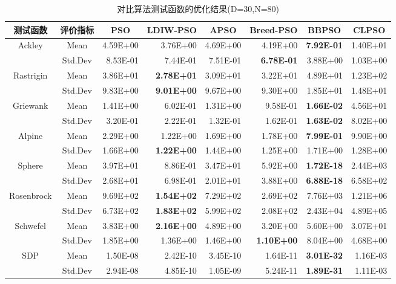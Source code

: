 \begin{table}[htbp]
	\renewcommand\arraystretch{1.1}
	\centering
	\caption{对比算法测试函数的优化结果(D=30,N=80)}
	\label{tabResult2}
	\begin{tabular}{ccrrrrrr}
		\toprule[1.5pt]
		测试函数  & 评价指标  & \multicolumn{1}{c}{PSO} & \multicolumn{1}{c}{LDIW-PSO} & \multicolumn{1}{c}{APSO} & \multicolumn{1}{c}{Breed-PSO} & \multicolumn{1}{c}{BBPSO} & \multicolumn{1}{c}{CLPSO} \\
		\midrule[1pt]
		Ackley & Mean  & 4.59E+00 & 3.76E+00 & 4.69E+00 & 4.19E+00 & \textbf{7.92E-01} & 1.40E+01 \\
		& Std.Dev & 8.53E-01 & 7.44E-01 & 7.51E-01 & \textbf{6.78E-01} & 3.88E+00 & 1.03E+00 \\
		Rastrigin & Mean  & 3.86E+01 & \textbf{2.78E+01} & 3.09E+01 & 3.22E+01 & 4.89E+01 & 1.23E+02 \\
		& Std.Dev & 9.83E+00 & \textbf{9.01E+00} & 9.67E+00 & 9.30E+00 & 1.85E+01 & 1.48E+01 \\
		Griewank & Mean  & 1.41E+00 & 6.02E-01 & 1.31E+00 & 9.58E-01 & \textbf{1.66E-02} & 4.56E+01 \\
		& Std.Dev & 3.20E-01 & 2.22E-01 & 1.32E-01 & 1.62E-01 & \textbf{1.63E-02} & 8.02E+00 \\
		Alpine & Mean  & 2.29E+00 & 1.22E+00 & 1.69E+00 & 1.78E+00 & \textbf{7.99E-01} & 9.90E+00 \\
		& Std.Dev & 1.66E+00 & \textbf{1.22E+00} & 1.44E+00 & 1.25E+00 & 1.71E+00 & 1.28E+00 \\
		Sphere & Mean  & 3.97E+01 & 8.86E-01 & 3.47E+01 & 5.92E+00 & \textbf{1.72E-18} & 2.44E+03 \\
		& Std.Dev & 2.68E+01 & 6.98E-01 & 2.01E+01 & 3.88E+00 & \textbf{6.88E-18} & 6.58E+02 \\
		Rosenbrock & Mean  & 9.69E+02 & \textbf{1.54E+02} & 7.29E+02 & 2.69E+02 & 7.76E+03 & 1.21E+06 \\
		& Std.Dev & 6.73E+02 & \textbf{1.83E+02} & 5.99E+02 & 2.08E+02 & 2.43E+04 & 4.89E+05 \\
		Schwefel & Mean  & 3.83E+00 & \textbf{2.16E+00} & 4.89E+00 & 3.20E+00 & 5.60E+00 & 3.07E+01 \\
		& Std.Dev & 1.85E+00 & 1.36E+00 & 1.46E+00 & \textbf{1.10E+00} & 8.04E+00 & 4.68E+00 \\
		SDP   & Mean  & 1.50E-08 & 2.42E-10 & 3.45E-10 & 1.64E-11 & \textbf{3.01E-32} & 1.16E-03 \\
		& Std.Dev & 2.94E-08 & 4.85E-10 & 1.05E-09 & 5.24E-11 & \textbf{1.89E-31} & 1.11E-03 \\
		\bottomrule[1.5pt]
	\end{tabular}%
\end{table}%

